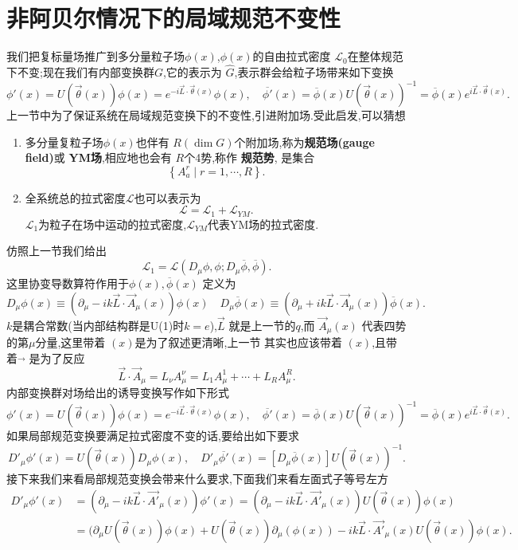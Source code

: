 \documentclass[../main.tex]{subfiles}
\begin{document}
 \section{非阿贝尔情况下的局域规范不变性}
 \label{sec:I-5-4}
 我们把复标量场推广到多分量粒子场$\phi(x)$,$\phi(x)$的自由拉式密度 $\mathscr{L}_0$在整体规范下不变;现在我们有内部变换群$G$,它的表示为 $\hat{G}$,表示群会给粒子场带来如下变换
 \[
 \phi'(x) = U(\vec{\theta}(x))\phi(x) = e^{-i \vec{L}\cdot \vec{\theta}(x)}\phi(x),\quad
 \overline{\phi'}(x) = \overline{\phi}(x) U(\vec{\theta}(x))^{-1}= \overline{\phi}(x)e^{i \vec{L}\cdot \vec{\theta}(x)}
 .\] 
 上一节中为了保证系统在局域规范变换下的不变性,引进附加场.受此启发,可以猜想
 \begin{enumerate}
 \item 多分量复粒子场$\phi(x)$也伴有 $R(\dim {G})$个附加场,称为\textbf{规范场(gauge field)}或 \textbf{YM场},相应地也会有 $R$个4势,称作 \textbf{规范势}, 是集合\[
     \left\{ A^r_a \mid r = 1, \cdots ,R \right\}   
 .\] 
 \item 全系统总的拉式密度$\mathscr{L}$也可以表示为\[
 \mathscr{L} = \mathscr{L}_1 + \mathscr{L}_{Y\!M}
 .\] 
 $\mathscr{L}_1$为粒子在场中运动的拉式密度,$\mathscr{L}_{Y\!M}$代表YM场的拉式密度.
 \end{enumerate}
 仿照上一节我们给出\[
 \mathscr{L}_1 = \mathscr{L}(D_\mu \phi, \phi; D_\mu \overline{\phi}, \overline{\phi})
 .\] 
 这里协变导数算符作用于$\phi(x),\overline{\phi}(x)$ 定义为\[
 D_\mu \phi(x) \equiv (\partial_\mu - ik \vec{L}\cdot \vec{A}_\mu(x))\phi(x)\quad
 D_\mu \overline{\phi}(x) \equiv (\partial_\mu + ik \vec{L}\cdot \vec{A}_\mu(x))\overline{\phi}(x)
 .\] 
 $k$是耦合常数(当内部结构群是U(1)时$k = e$),$\vec{L}$ 就是上一节的$q$,而 $\vec{A}_\mu(x)$ 代表四势的第$\mu$分量,这里带着 $(x)$是为了叙述更清晰,上一节
 其实也应该带着 $(x)$,且带着$\vec{ }$ 是为了反应\[
 \vec{L} \cdot  \vec{A}_\mu = L_\nu A^\nu_\mu = L_1 A^1_\mu + \cdots + L_R A^R_\mu
 .\] 
 内部变换群对场给出的诱导变换写作如下形式\[
 \phi'(x) = U(\vec{\theta}(x))\phi(x) = e^{-i \vec{L}\cdot \vec{\theta}(x)}\phi(x), \quad  
 \overline{\phi'}(x) = \overline{\phi}(x)U(\vec{\theta}(x))^{-1} = \overline{\phi}(x) e^{i \vec{L}\cdot \vec{\theta}(x)}
 .\] 
 如果局部规范变换要满足拉式密度不变的话,要给出如下要求
 \[
 D'_\mu \phi'(x) = U(\vec{\theta}(x)) D_\mu \phi(x), \quad D'_\mu \overline{\phi'}(x) = [D_\mu \overline{\phi}(x)]U (\vec{\theta}(x))^{-1}
 .\] 
 接下来我们来看局部规范变换会带来什么要求,下面我们来看左面式子等号左方
 \begin{align*}
 D'_\mu \phi'(x) &= (\partial_\mu - ik \vec{L}\cdot \vec{A'}_\mu(x))\phi'(x) = (\partial_\mu - ik \vec{L}\cdot \vec{A'}_\mu(x)) U(\vec{\theta}(x)) \phi(x)\\
                 & =  (\partial_\mu U(\vec{\theta}(x)) \phi(x)+ U(\vec{\theta}(x)) \partial_\mu(\phi(x)) - ik \vec{L} \cdot \vec{A'}_\mu(x) U(\vec{\theta}(x))\phi(x)
 .\end{align*}
\end{document}
